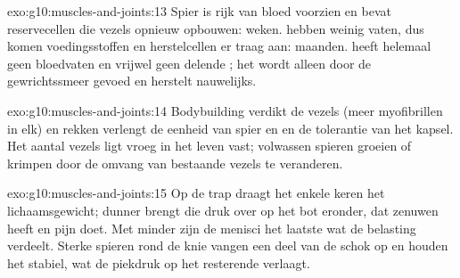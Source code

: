 \begin{solution}{exo:g10:muscles-and-joints:13}
Spier is rijk van bloed voorzien en bevat reservecellen die vezels
opnieuw opbouwen: weken.  hebben weinig vaten, dus komen
voedingsstoffen en herstelcellen er traag aan: maanden.  heeft
helemaal geen bloedvaten en vrijwel geen delende ; het wordt alleen
door de gewrichtssmeer gevoed en herstelt nauwelijks.
\end{solution}

\begin{solution}{exo:g10:muscles-and-joints:14}
Bodybuilding verdikt de vezels (meer myofibrillen in elk) en rekken
verlengt de eenheid van spier en  en de tolerantie van het kapsel.
Het aantal vezels ligt vroeg in het leven vast; volwassen spieren groeien
of krimpen door de omvang van bestaande vezels te veranderen.
\end{solution}

\begin{solution}{exo:g10:muscles-and-joints:15}
Op de trap draagt het  enkele keren het lichaamsgewicht; dunner
 brengt die druk over op het bot eronder, dat zenuwen heeft en
pijn doet. Met minder  zijn de menisci het laatste wat de
belasting verdeelt. Sterke spieren rond de knie vangen een deel van de
schok op en houden het  stabiel, wat de piekdruk op het
resterende  verlaagt.
\end{solution}

